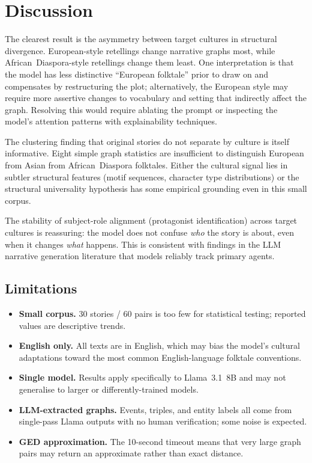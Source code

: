 \documentclass[11pt,a4paper]{article}
\begin{document}
\section{Discussion}

The clearest result is the asymmetry between target cultures in structural
divergence.  European-style retellings change narrative graphs most, while
African~Diaspora-style retellings change them least.  One interpretation is that
the model has less distinctive ``European folktale'' prior to draw on and
compensates by restructuring the plot; alternatively, the European style may
require more assertive changes to vocabulary and setting that indirectly
affect the graph.  Resolving this would require ablating the prompt or inspecting
the model's attention patterns with explainability techniques.

The clustering finding that original stories do not separate by culture is
itself informative.  Eight simple graph statistics are insufficient to distinguish
European from Asian from African~Diaspora folktales.  Either the cultural signal
lies in subtler structural features (motif sequences, character type distributions)
or the structural universality hypothesis has some empirical grounding even in
this small corpus.

The stability of subject-role alignment (protagonist identification) across
target cultures is reassuring: the model does not confuse \emph{who} the story
is about, even when it changes \emph{what} happens.  This is consistent with
findings in the LLM narrative generation literature that models reliably track
primary agents.

\subsection*{Limitations}

\begin{itemize}[noitemsep]
  \item \textbf{Small corpus.} 30 stories / 60 pairs is too few for statistical
    testing; reported values are descriptive trends.
  \item \textbf{English only.} All texts are in English, which may bias the
    model's cultural adaptations toward the most common English-language folktale
    conventions.
  \item \textbf{Single model.} Results apply specifically to Llama~3.1~8B and
    may not generalise to larger or differently-trained models.
  \item \textbf{LLM-extracted graphs.} Events, triples, and entity labels all
    come from single-pass Llama outputs with no human verification; some noise
    is expected.
  \item \textbf{GED approximation.} The 10-second timeout means that very large
    graph pairs may return an approximate rather than exact distance.
\end{itemize}
\end{document}
